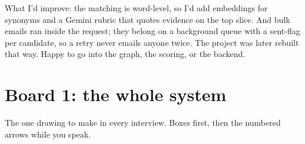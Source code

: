 \begin{sayit}
What I'd improve: the matching is word-level, so I'd add embeddings for synonyms and a Gemini rubric that quotes evidence on the top slice. And bulk emails ran inside the request; they belong on a background queue with a sent-flag per candidate, so a retry never emails anyone twice. The project was later rebuilt that way. Happy to go into the graph, the scoring, or the backend.
\end{sayit}

\section{Board 1: the whole system}
The one drawing to make in every interview. Boxes first, then the numbered arrows while you speak.


